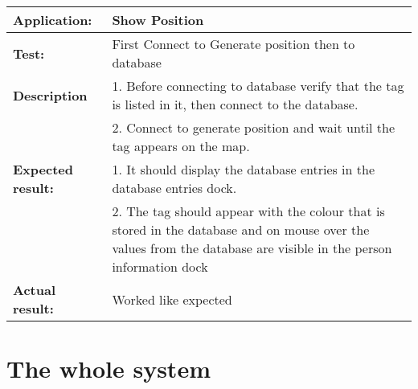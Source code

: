    \begin{tabular}{|p{3.5cm}|p{10.5cm}|}
    \hline
     \textbf{Application:}	& Show Position\\
    \hline
     \textbf{Test:}		& First Connect to Generate position then to database\\
    \hline
     \textbf{Description}	& 1. Before connecting to database verify that the tag is listed in it, then connect to the database.\\
     				& 2. Connect to generate position and wait until the tag appears on the map.\\
    \hline
     \textbf{Expected result:}	& 1. It should display the database entries in the database entries dock.\\
     				& 2. The tag should appear with the colour that is stored in the database and on mouse over the values from the database are visible in the person information dock\\
    \hline
     \textbf{Actual result:}	& Worked like expected\\
    \hline
   \end{tabular}
 \section{The whole system}

